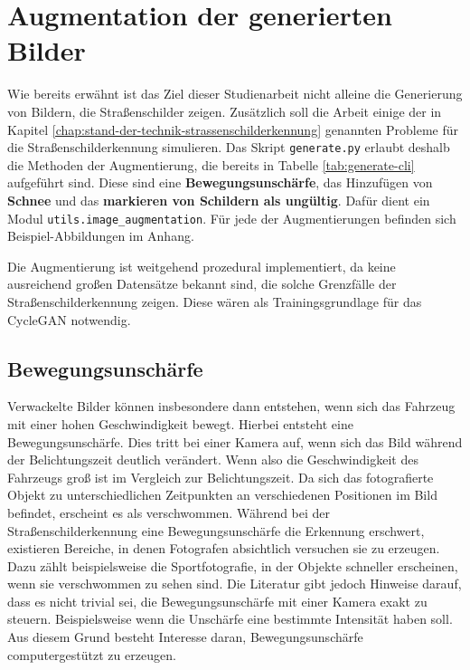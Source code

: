 \chapter{Augmentation der generierten Bilder}

\label{chap:5}

Wie bereits erwähnt ist das Ziel dieser Studienarbeit nicht alleine die Generierung von Bildern, die Straßenschilder zeigen. Zusätzlich soll die Arbeit einige der in Kapitel \ref{chap:stand-der-technik-strassenschilderkennung} genannten Probleme für die Straßenschilderkennung simulieren. Das Skript \texttt{generate.py} erlaubt deshalb die Methoden der Augmentierung, die bereits in Tabelle \ref{tab:generate-cli} aufgeführt sind. Diese sind eine \textbf{Bewegungsunschärfe}, das Hinzufügen von \textbf{Schnee} und das \textbf{markieren von Schildern als ungültig}. Dafür dient ein Modul \texttt{utils.image_augmentation}. Für jede der Augmentierungen befinden sich Beispiel-Abbildungen im Anhang.

Die Augmentierung ist weitgehend prozedural implementiert, da keine ausreichend großen Datensätze bekannt sind, die solche Grenzfälle der Straßenschilderkennung zeigen. Diese wären als Trainingsgrundlage für das \ac{CycleGAN} notwendig.

\section{Bewegungsunschärfe}
\label{sec:motion-blur}
Verwackelte Bilder können insbesondere dann entstehen, wenn sich das Fahrzeug mit einer hohen Geschwindigkeit bewegt. Hierbei entsteht eine Bewegungsunschärfe. Dies tritt bei einer Kamera auf, wenn sich das Bild während der Belichtungszeit deutlich verändert. Wenn also die Geschwindigkeit des Fahrzeugs groß ist im Vergleich zur Belichtungszeit. Da sich das fotografierte Objekt zu unterschiedlichen Zeitpunkten an verschiedenen Positionen im Bild befindet, erscheint es als verschwommen. Während bei der Straßenschilderkennung eine Bewegungsunschärfe die Erkennung erschwert, existieren Bereiche, in denen Fotografen absichtlich versuchen sie zu erzeugen. Dazu zählt beispielsweise die Sportfotografie, in der Objekte schneller erscheinen, wenn sie verschwommen zu sehen sind. Die Literatur gibt jedoch Hinweise darauf, dass es nicht trivial sei, die Bewegungsunschärfe mit einer Kamera exakt zu steuern. Beispielsweise wenn die Unschärfe eine bestimmte Intensität haben soll. Aus diesem Grund besteht Interesse daran, Bewegungsunschärfe computergestützt zu erzeugen. \cite{motion-blur}

